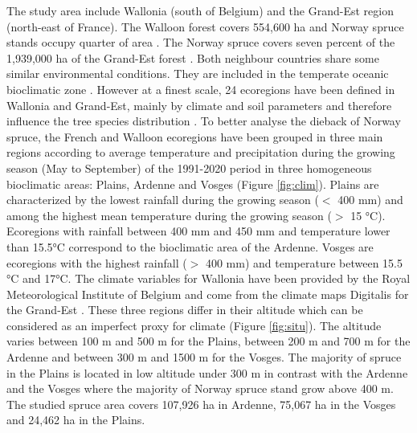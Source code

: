 \documentclass[3p,procedia]{elsarticle}
\begin{document}
The study area include Wallonia (south of Belgium) and the Grand-Est region (north-east of France).
The Walloon forest covers 554,600 ha and  Norway spruce stands occupy quarter of area \citep{lejeune_ep_2022}.  
The Norway spruce covers seven percent of the 1,939,000 ha of the Grand-Est forest \citep{IGN2022}. 
Both neighbour countries share some similar environmental conditions.
They are included in the temperate oceanic bioclimatic zone \citep{lindner_climate_2010}.
However at a finest scale, 24 ecoregions have been defined in  Wallonia and Grand-Est, mainly by climate and soil parameters and therefore influence the tree species distribution \citep{walthert_tree_2017}.
To better analyse the dieback of Norway spruce, the French and Walloon ecoregions have been grouped in three main regions according to average temperature and precipitation during the growing season (May to September) of the 1991-2020 period in three homogeneous bioclimatic areas: Plains, Ardenne and Vosges (Figure \ref{fig:clim}).
Plains are characterized by the lowest rainfall during the growing season ($<$ 400 mm) and among the highest mean temperature during the growing season ($>$ 15 °C).
Ecoregions with rainfall between 400 mm and 450 mm and temperature lower than 15.5°C correspond to the bioclimatic area of the Ardenne.
Vosges are ecoregions with the highest rainfall ($>$ 400 mm) and temperature between 15.5 °C and 17°C.
The climate variables for Wallonia have been provided by the Royal Meteorological Institute of Belgium and come from the climate maps Digitalis for the Grand-Est \citep{piedallu_presentation_2014}.
These three regions differ in their altitude which can be considered as an imperfect proxy for climate (Figure \ref{fig:situ}). 
The altitude varies between 100 m and 500 m for the Plains, between 200 m and 700 m for the Ardenne and between 300 m and 1500 m for the Vosges.
The majority of spruce in the Plains is located in low altitude under 300 m in contrast with the Ardenne and the Vosges where the majority of Norway spruce stand grow above 400 m. 
The studied spruce area covers 107,926 ha in Ardenne, 75,067 ha in the Vosges and  24,462 ha in the Plains.%
\end{document}
